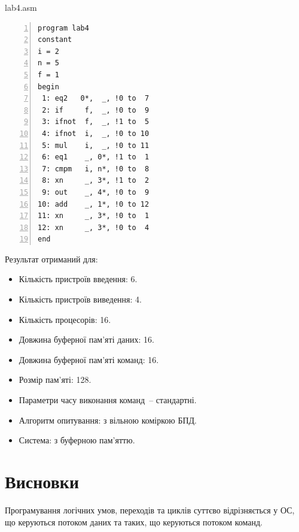 \documentclass[a4paper, 10pt]{article}
\begin{document}
lab4.asm
\begin{lstlisting}[numbers=left]
program lab4
constant
i = 2
n = 5
f = 1
begin
 1: eq2   0*,  _, !0 to  7
 2: if     f,  _, !0 to  9
 3: ifnot  f,  _, !1 to  5
 4: ifnot  i,  _, !0 to 10
 5: mul    i,  _, !0 to 11
 6: eq1    _, 0*, !1 to  1
 7: cmpm   i, n*, !0 to  8
 8: xn     _, 3*, !1 to  2
 9: out    _, 4*, !0 to  9
10: add    _, 1*, !0 to 12
11: xn     _, 3*, !0 to  1
12: xn     _, 3*, !0 to  4
end
\end{lstlisting}

Результат отриманий для:\\
\begin{itemize}
	\item Кількість пристроїв введення: 6.
	\item Кількість пристроїв виведення: 4.
	\item Кількість процесорів: 16.
	\item Довжина буферної пам'яті даних: 16.
	\item Довжина буферної пам'яті команд: 16.
	\item Розмір пам'яті: 128.
	\item Параметри часу виконання команд~-- стандартні.
	\item Алгоритм опитування: з вільною коміркою БПД.
	\item Система: з буферною пам'яттю.
\end{itemize}

\section{Висновки}
Програмування логічних умов, переходів та циклів суттєво відрізняється у ОС, що керуються потоком даних та таких, що керуються потоком команд.
\end{document}
